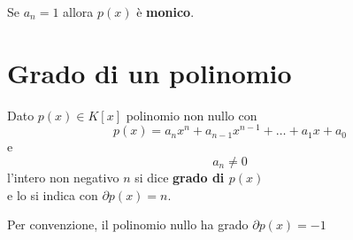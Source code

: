 \documentclass[a4paper,12pt, oneside]{book}
\begin{document}
\begin{nota}
	Se $a_n = 1$ allora $p(x)$ è \textbf{monico}.
\end{nota}

\section{Grado di un polinomio}
\begin{definizione}
	Dato $p(x) \in K[x]$ polinomio non nullo con
	$$p(x) = a_{n}x^{n} + a_{n-1}x^{n-1} + \dots + a_{1}x + a_{0}$$
	e
	$$a_n \not = 0$$
	l'intero non negativo $n$ si dice \textbf{grado di $p(x)$}\\
	e lo si indica con $\partial p(x) = n$.
\end{definizione}
\begin{nota}
	Per convenzione, il polinomio nullo ha grado $\partial p(x) = -1$
\end{nota}
\end{document}
